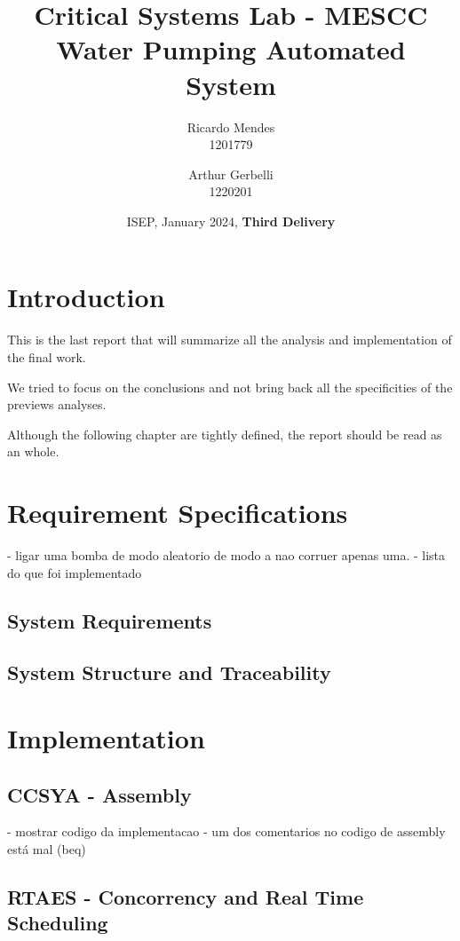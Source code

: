 \documentclass[11pt]{article}
\title{\textbf{Critical Systems Lab - MESCC\\ Water Pumping Automated System}}
\date{ISEP, January 2024, \textbf{Third Delivery}}
\author{Ricardo Mendes\\ 1201779
\and Arthur Gerbelli\\ 1220201}
\begin{document}
\maketitle              
\newpage
\tableofcontents
\newpage

%
\section{Introduction}

This is the last report that will summarize all the analysis and implementation of the final work.

We tried to focus on the conclusions and not bring back all the specificities of the previews analyses. 

Although the following chapter are tightly defined, the report should be read as an whole. 

\section{Requirement Specifications}

- ligar uma bomba de modo aleatorio de modo a nao corruer apenas uma.
- lista do que foi implementado

\subsection{System Requirements}

\subsection{System Structure and Traceability}


\newpage
\section{Implementation}

\subsection{CCSYA - Assembly}

- mostrar codigo da implementacao
- um dos comentarios no codigo de assembly está mal (beq)

\subsection{RTAES - Concorrency and Real Time Scheduling}
\end{document}
